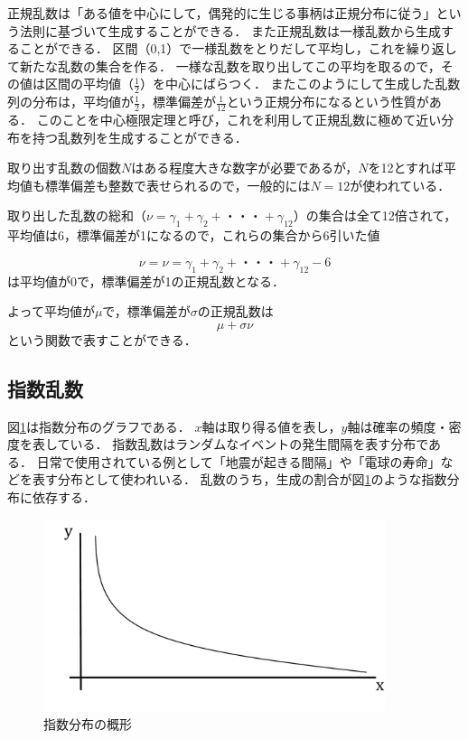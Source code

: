 \documentclass[12pt,a4j]{ltjsarticle}
\begin{document}
正規乱数は「ある値を中心にして，偶発的に生じる事柄は正規分布に従う」という法則に基づいて生成することができる．
また正規乱数は一様乱数から生成することができる．
区間（0,1）で一様乱数をとりだして平均し，これを繰り返して新たな乱数の集合を作る．
一様な乱数を取り出してこの平均を取るので，その値は区間の平均値（$\frac{1}{2}$）を中心にばらつく．
またこのようにして生成した乱数列の分布は，平均値が$\frac{1}{2}$，標準偏差が$\frac{1}{12}$という正規分布になるという性質がある．
このことを中心極限定理と呼び，これを利用して正規乱数に極めて近い分布を持つ乱数列を生成することができる．

取り出す乱数の個数$N$はある程度大きな数字が必要であるが，$N$を12とすれば平均値も標準偏差も整数で表せられるので，一般的には$N = 12$が使われている．

取り出した乱数の総和（$\nu=\gamma_1+\gamma_2+・・・+\gamma_{12}$）の集合は全て12倍されて，平均値は6，標準偏差が1になるので，これらの集合から6引いた値

\begin{equation}
	\nu =  \nu=\gamma_1+\gamma_2+・・・+\gamma_{12}-6 \tag{a}
	\label{eq:a式}
\end{equation}
は平均値が0で，標準偏差が1の正規乱数となる．
	
よって平均値が$\mu$で，標準偏差が$\sigma$の正規乱数は
\begin{equation}
	\mu+\sigma\nu \tag{b}
	\label{eq:b式}
\end{equation}	
という関数で表すことができる．

\clearpage

\subsection{指数乱数}
図\ref{fig:指数乱数のグラフ}は指数分布のグラフである．
$x$軸は取り得る値を表し，$y$軸は確率の頻度・密度を表している．
指数乱数はランダムなイベントの発生間隔を表す分布である．
日常で使用されている例として「地震が起きる間隔」や「電球の寿命」などを表す分布として使われいる\cite{Exponential}．
乱数のうち，生成の割合が図\ref{fig:指数乱数のグラフ}のような指数分布に依存する．
\vspace{5mm}
\begin{figure}[h]
\begin{center}
\includegraphics[width = 100mm ] {figures/sisu.pdf}
\caption{指数分布の概形}
\label{fig:指数乱数のグラフ}
\end{center}
\end{figure}
\end{document}
